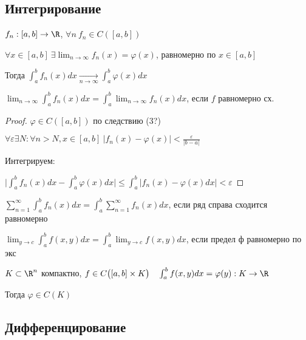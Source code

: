   \subsection*{Интегрирование}

  \begin{theorem} %
    $f_n: [a,b] \to \R$, $\forall n \ f_n \in C([a,b])$

    $\forall x \in [a,b] \ \exists \lim_{n\to\infty} f_n(x) = \varphi(x)$, равномерно по $x\in [a,b]$

    Тогда $\int^b_a f_n(x)dx \underset{n\to\infty}{\longrightarrow} \int^b_a \varphi(x)dx$
  \end{theorem}  
  \begin{remark}
    $\lim_{n\to\infty}\int^b_a f_n(x)dx = \int^b_a\lim_{n\to\infty}f_n(x)dx$, если $f$ равномерно сх.
  \end{remark}
  \begin{proof}
    $\varphi \in C([a,b])$ по следствию (3?)

    $\forall \varepsilon \exists N: \forall n > N, x \in [a,b] \ | f_n(x) - \varphi(x) | < \frac{\varepsilon}{|b-a|}$

    Интегрируем:

    $\Big|\int^b_a f_n(x) dx - \int^b_a\varphi(x)dx\Big| \le \int^b_a |f_n(x) - \varphi(x) dx |< \varepsilon$
  \end{proof}

  
  \begin{corollary} %
    $\sum^\infty_{n=1} \int^b_a f_n(x)dx = \int^b_a \sum^\infty_{n=1} f_n(x)dx$, если ряд справа сходится равномерно
  \end{corollary}

  \begin{corollary}
    $\lim_{y\to c} \int^b_a f(x,y)dx = \int^b_a\lim_{y\to c} f(x,y)dx$, если предел ф равномерно по экс 
  \end{corollary}

  \begin{corollary}
    $K \subset \R^n$ компактно, $f \in C \big([a,b] \times K\big) \quad \int^b_a f(x,y)dx = \varphi(y): K\to\R$

    Тогда $\varphi \in C(K)$
  \end{corollary}

  \subsection*{Дифференцирование}

